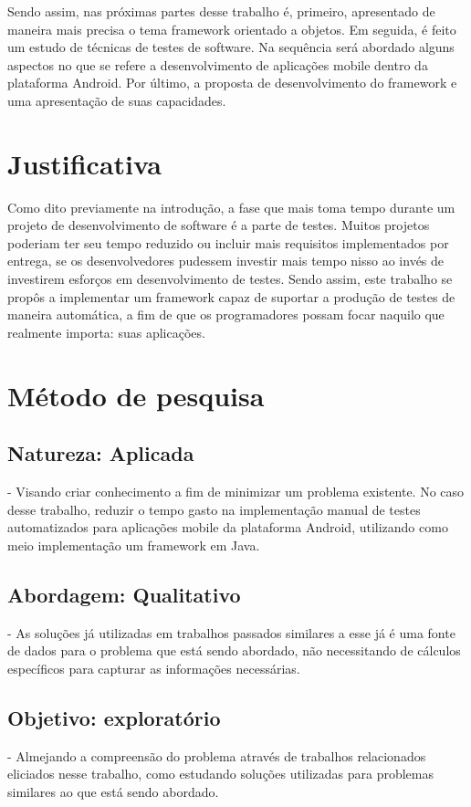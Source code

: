 \documentclass[
    12pt,       %
    openright,      %
    twoside,      %
    a4paper,      %
    english,      %
    french,       %
    spanish,      %
    brazil,       %
    ]{abntex2}
\begin{document}
  Sendo assim, nas próximas partes desse trabalho é, primeiro, apresentado de maneira
  mais precisa o tema framework orientado a objetos. Em seguida, é feito um estudo de
  técnicas de testes de software. Na sequência será abordado alguns aspectos no que se refere a
  desenvolvimento de aplicações mobile dentro da plataforma Android. Por último, a
  proposta de desenvolvimento do framework e uma apresentação de suas capacidades.

  \section{Justificativa}
      Como dito previamente na introdução, a fase que mais toma tempo durante
      um projeto de desenvolvimento de software é a parte de testes. Muitos
      projetos poderiam ter seu tempo reduzido ou incluir mais requisitos
      implementados por entrega, se os desenvolvedores pudessem investir mais
      tempo nisso ao invés de investirem esforços em desenvolvimento de testes.
      Sendo assim, este trabalho se propôs a implementar um framework capaz de
      suportar a produção de testes de maneira automática, a fim de que os
      programadores possam focar naquilo que realmente importa: suas aplicações.

  \section{Método de pesquisa}

    \subsection{Natureza: Aplicada} - Visando criar conhecimento a fim de minimizar
    um problema existente. No caso desse trabalho, reduzir o tempo gasto na
    implementação manual de testes automatizados para aplicações mobile da
    plataforma Android, utilizando como meio implementação um framework
    em Java.

    \subsection{Abordagem: Qualitativo} - As soluções já utilizadas em trabalhos
    passados similares a esse já é uma fonte de dados para o problema que
    está sendo abordado, não necessitando de cálculos específicos para
    capturar as informações necessárias.

    \subsection{Objetivo: exploratório} - Almejando a compreensão do problema através
    de trabalhos relacionados eliciados nesse trabalho, como estudando soluções
    utilizadas para problemas similares ao que está sendo abordado.
\end{document}
